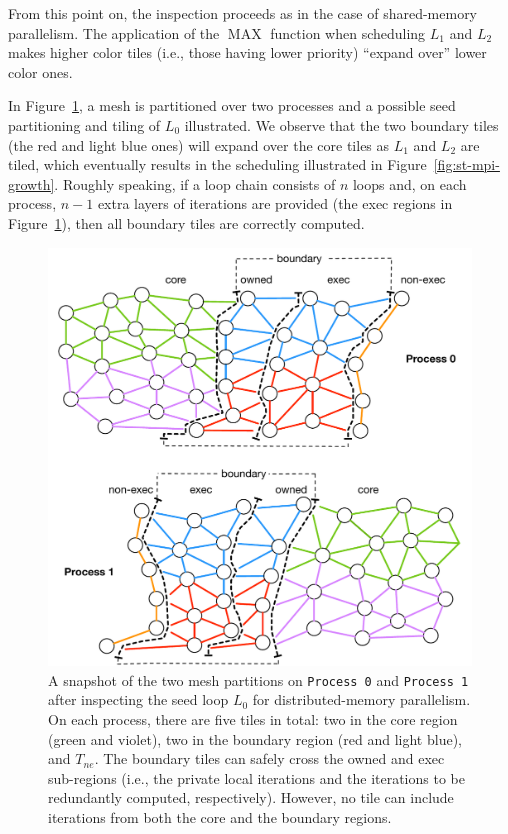 From this point on, the inspection proceeds as in the case of shared-memory parallelism. The application of the $\operatorname{MAX}$ function when scheduling $L_1$ and $L_2$ makes higher color tiles (i.e., those having lower priority) ``expand over'' lower color ones. 

In Figure~\ref{fig:st-mpi-init}, a mesh is partitioned over two processes and a possible seed partitioning and tiling of $L_0$ illustrated. We observe that the two boundary tiles (the red and light blue ones) will expand over the core tiles as $L_1$ and $L_2$ are tiled, which eventually results in the scheduling illustrated in Figure~\ref{fig:st-mpi-growth}. Roughly speaking, if a loop chain consists of $n$ loops and, on each process, $n-1$ extra layers of iterations are provided (the exec regions in Figure~\ref{fig:st-mpi-init}), then all boundary tiles are correctly computed. 

\begin{figure}[thpb]
\centering
\includegraphics[scale=0.6]{sparsetiling/figures/mpi_loop0.pdf}
\caption{A snapshot of the two mesh partitions on {\tt Process 0} and {\tt Process 1} after inspecting the seed loop $L_0$ for distributed-memory parallelism. On each process, there are five tiles in total: two in the core region (green and violet), two in the boundary region (red and light blue), and $T_{ne}$. The boundary tiles can safely cross the owned and exec sub-regions (i.e., the private local iterations and the iterations to be redundantly computed, respectively). However, no tile can include iterations from both the core and the boundary regions. }
\label{fig:st-mpi-init}
\end{figure}

